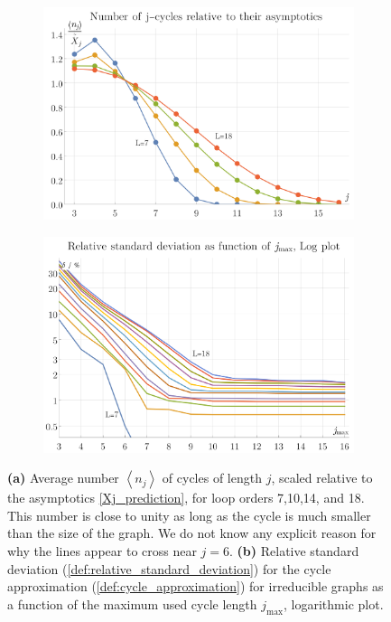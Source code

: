 \documentclass[11pt]{scrartcl}
\numberwithin{equation}{section}
\begin{document}
\begin{figure}[htb]
	\centering 
	\begin{subfigure}[b]{.48 \textwidth}
		\includegraphics[width=\linewidth]{figures/cycle_length}
		\subcaption{}
		\label{fig:cycle_length}
	\end{subfigure}
	\begin{subfigure}[b]{.48 \textwidth}
		\includegraphics[width=\linewidth]{figures/cycles_delta}
		\subcaption{}
		\label{fig:cycles_delta}
	\end{subfigure}
	
	\caption{\textbf{(a)} Average number $\left \langle n_j \right \rangle $ of cycles of length $j$, scaled relative to the asymptotics \cref{Xj_prediction}, for loop orders 7,10,14, and 18. This number is close to unity as long as the cycle is much smaller than the size of the graph. We do not know any explicit reason for why the lines appear to cross near $j=6$. \textbf{(b)} Relative standard deviation (\cref{def:relative_standard_deviation}) for the cycle approximation (\cref{def:cycle_approximation}) for irreducible graphs as a function of the maximum used cycle length $j_\text{max}$, logarithmic plot.   }

\end{figure}
\end{document}

